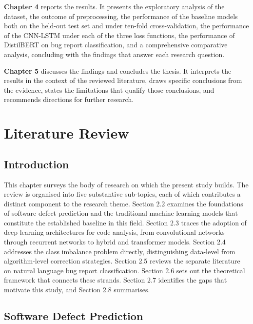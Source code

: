 \documentclass[12pt,a4paper,oneside]{report}
\begin{document}
\textbf{Chapter 4} reports the results. It presents the exploratory analysis of the dataset, the outcome of preprocessing, the performance of the baseline models both on the held-out test set and under ten-fold cross-validation, the performance of the CNN-LSTM under each of the three loss functions, the performance of DistilBERT on bug report classification, and a comprehensive comparative analysis, concluding with the findings that answer each research question.

\textbf{Chapter 5} discusses the findings and concludes the thesis. It interprets the results in the context of the reviewed literature, draws specific conclusions from the evidence, states the limitations that qualify those conclusions, and recommends directions for further research.

\clearpage

\chapter{Literature Review}

\section{Introduction}

This chapter surveys the body of research on which the present study builds. The review is organised into five substantive sub-topics, each of which contributes a distinct component to the research theme. Section 2.2 examines the foundations of software defect prediction and the traditional machine learning models that constitute the established baseline in this field. Section 2.3 traces the adoption of deep learning architectures for code analysis, from convolutional networks through recurrent networks to hybrid and transformer models. Section 2.4 addresses the class imbalance problem directly, distinguishing data-level from algorithm-level correction strategies. Section 2.5 reviews the separate literature on natural language bug report classification. Section 2.6 sets out the theoretical framework that connects these strands. Section 2.7 identifies the gaps that motivate this study, and Section 2.8 summarises.

\section{Software Defect Prediction}
\end{document}
